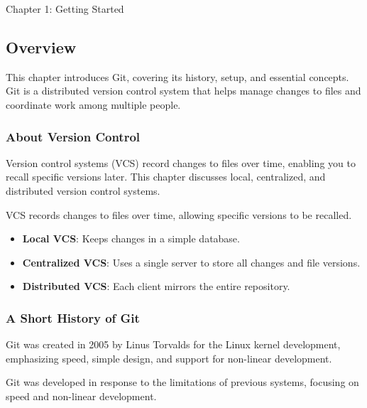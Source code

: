 \begin{notes}{Chapter 1: Getting Started}
    \subsection*{Overview}

    This chapter introduces Git, covering its history, setup, and essential concepts. Git is a distributed version control system that helps manage changes to files and coordinate work among multiple people.
    
    \subsubsection*{About Version Control}
    
    Version control systems (VCS) record changes to files over time, enabling you to recall specific versions later. This chapter discusses local, centralized, and distributed version control systems.
    
    \begin{highlight}
    
        VCS records changes to files over time, allowing specific versions to be recalled.
        
        \begin{itemize}
            \item \textbf{Local VCS}: Keeps changes in a simple database.
            \item \textbf{Centralized VCS}: Uses a single server to store all changes and file versions.
            \item \textbf{Distributed VCS}: Each client mirrors the entire repository.
        \end{itemize}
    
    \end{highlight}
    
    \subsubsection*{A Short History of Git}
    
    Git was created in 2005 by Linus Torvalds for the Linux kernel development, emphasizing speed, simple design, and support for non-linear development.
    
    \begin{highlight}
    
        Git was developed in response to the limitations of previous systems, focusing on speed and non-linear development.
        

\end{highlight}
\end{notes}
